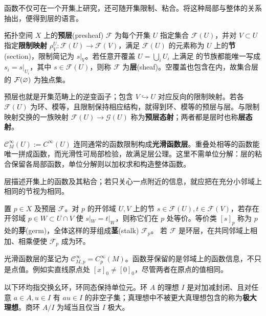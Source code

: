 函数不仅可在一个开集上研究，还可随开集限制、粘合。将这种局部与整体的关系抽出，便得到层的语言。

\begin{definition}\label{def:presheaf-sheaf}
    拓扑空间 $X$ 上的\textbf{预层}(presheaf) $\mathcal F$ 为每个开集 $U$ 指定集合 $\mathcal F(U)$，并对 $V\subset U$ 指定\textbf{限制映射} $\rho^U_V:\mathcal F(U)\to\mathcal F(V)$，满足
    $\mathcal F(U)$ 的元素称为 $U$ 上的\textbf{节}(section)，限制简记为 $s|_V$。若任意开覆盖 $U=\bigcup_iU_i$ 上满足
    的节族都能唯一写成 $s_i=s|_{U_i}$，其中 $s\in\mathcal F(U)$，则称 $\mathcal F$ 为\textbf{层}(sheaf)。空覆盖也包含在内，故集合层的 $\mathcal F(\varnothing)$ 为独点集。
\end{definition}

预层也就是开集范畴上的逆变函子；包含 $V\hookrightarrow U$ 对应反向的限制映射。若各 $\mathcal F(U)$ 为环、模等，且限制保持相应结构，就得到环、模等的预层与层。与限制映射交换的一族映射 $\mathcal F(U)\to\mathcal G(U)$ 称为\textbf{预层态射}；两者都是层时也称\textbf{层态射}。

\begin{example}
    $\mathcal C^\infty_M(U):=C^\infty(U)$ 连同通常的函数限制构成\textbf{光滑函数层}。重叠处相等的函数能唯一拼成函数，而光滑性可局部检验，故满足层公理。这里不需单位分解：层的粘合保留各局部函数，单位分解则以加权求和构造整体函数。
\end{example}

层描述开集上的函数及其粘合；若只关心一点附近的信息，就应把在充分小邻域上相同的节视为相同。

\begin{definition}\label{def:sheaf-stalk}
    置 $p\in X$ 及预层 $\mathcal F$。对 $p$ 的开邻域 $U,V$ 上的节 $s\in\mathcal F(U),t\in\mathcal F(V)$，若存在开邻域 $p\in W\subset U\cap V$ 使 $s|_W=t|_W$，则称它们在 $p$ 处等价。等价类 $[s]_p$ 称为 $p$ 处的\textbf{芽}(germ)，全体这样的芽组成\textbf{茎}(stalk) $\mathcal F_p$。
    若 $\mathcal F$ 是环层，在共同邻域上相加、相乘便使 $\mathcal F_p$ 成为环。
\end{definition}

光滑函数层的茎记为 $\mathcal C^\infty_{M,p}=C^\infty_p(M)$。函数芽保留的是邻域上的函数信息，不只是点值。例如实直线原点处 $[x]_0\ne[0]_0$，尽管两者在原点的值相同。

以下环均指交换幺环，环同态保持单位元。环 $A$ 的理想 $I$ 是对加减封闭、且对任意 $a\in A,u\in I$ 有 $au\in I$ 的非空子集；真理想中不被更大真理想包含的称为\textbf{极大理想}。商环 $A/I$ 为域当且仅当 $I$ 极大。

